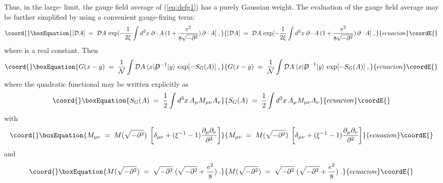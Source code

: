 \documentclass[12pt,a4paper]{article} \usepackage[latin1] {inputenc}
\begin{document}
Thus, in the large-\coordHE{} limit, the gauge field average of
(\ref{eq:defg1}) has a purely Gaussian weight. The evaluation of the
gauge field average may be further simplified by using a convenient
gauge-fixing term:
\begin{equation}\coord{}\boxEquation{
[{\mathcal D}A]\;=\; {\mathcal D}A \, \exp[ - \frac{1}{2 \xi} 
\int d^3x \; \partial\cdot A \,( 1 + \frac{e^2}{8
  \sqrt{-\partial^2}}) \, \partial \cdot A ] \;,
}{
[{\mathcal D}A]\;=\; {\mathcal D}A \, \exp[ - \frac{1}{2 \xi} 
\int d^3x \; \partial\cdot A \,( 1 + \frac{e^2}{8
  \sqrt{-\partial^2}}) \, \partial \cdot A ] \;,
}{ecuacion}\coordE{}\end{equation}
where \myHighlight{$\xi$}\coordHE{} is a real constant. Then
\begin{equation}\coord{}\boxEquation{\label{eq:g1}
G(x-y) \;=\; \frac{1}{{\mathcal N}} \int {\mathcal D}A \,
\langle x| {\not \!\! D}^{-1} |y \rangle \, \exp [ - S_G(A) ] \;,
}{G(x-y) \;=\; \frac{1}{{\mathcal N}} \int {\mathcal D}A \,
\langle x| {\not \!\! D}^{-1} |y \rangle \, \exp [ - S_G(A) ] \;,
}{ecuacion}\coordE{}\end{equation}
where the quadratic functional \coordHE{} may be written explicitly as
\begin{equation}\coord{}\boxEquation{
S_G(A) \;=\; \frac{1}{2} \int d^3x \, A_\mu M_{\mu\nu} A_\nu 
}{
S_G(A) \;=\; \frac{1}{2} \int d^3x \, A_\mu M_{\mu\nu} A_\nu 
}{ecuacion}\coordE{}\end{equation}
with
\begin{equation}\coord{}\boxEquation{
M_{\mu\nu} \;=\; M(\sqrt{-\partial^2}) \; \left[ \delta_{\mu\nu} +
  (\xi^{-1}-1) 
\frac{\partial_\mu\partial_\nu}{\partial^2} \right]
}{
M_{\mu\nu} \;=\; M(\sqrt{-\partial^2}) \; \left[ \delta_{\mu\nu} +
  (\xi^{-1}-1) 
\frac{\partial_\mu\partial_\nu}{\partial^2} \right]
}{ecuacion}\coordE{}\end{equation}
and
\begin{equation}\coord{}\boxEquation{
 M(\sqrt{-\partial^2})\;=\; \sqrt{-\partial^2} \; ( \sqrt{-\partial^2}
+ \frac{e^2}{8}) \;.
}{
 M(\sqrt{-\partial^2})\;=\; \sqrt{-\partial^2} \; ( \sqrt{-\partial^2}
+ \frac{e^2}{8}) \;.
}{ecuacion}\coordE{}\end{equation}
\end{document}
